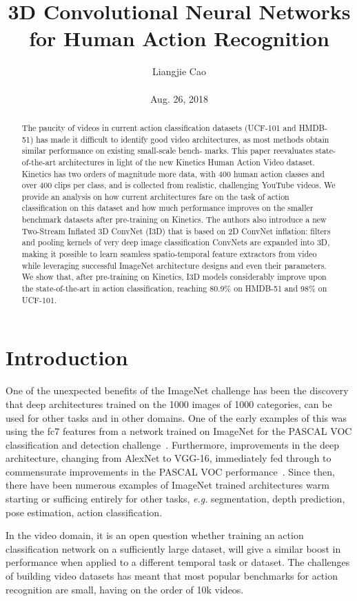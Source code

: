 \documentclass[10pt,twocolumn,letterpaper]{article}
\begin{document}
\title{\textbf{3D Convolutional Neural Networks for Human Action Recognition}}
\author{Liangjie Cao\\\\ Aug. 26, 2018}
\maketitle
\begin{abstract}
The paucity of videos in current action classification datasets (UCF-101 and HMDB-51) has made it difficult to identify good video architectures, as most methods obtain similar performance on existing small-scale bench-
marks. This paper reevaluates state-of-the-art architectures in light of the new Kinetics Human Action Video dataset. Kinetics has two orders of magnitude more data, with 400 human action classes and over 400 clips per
class, and is collected from realistic, challenging YouTube videos. We provide an analysis on how current architectures fare on the task of action classification on this dataset and how much performance improves on the smaller benchmark datasets after pre-training on Kinetics.
The authors also introduce a new Two-Stream Inflated 3D ConvNet (I3D) that is based on 2D ConvNet inflation: filters and pooling kernels of very deep image classification ConvNets are expanded into 3D, making it possible
to learn seamless spatio-temporal feature extractors from video while leveraging successful ImageNet architecture designs and even their parameters. We show that, after pre-training on Kinetics, I3D models considerably improve upon the state-of-the-art in action classification, reaching 80.9\% on HMDB-51 and 98\% on UCF-101.
\end{abstract}
\section{Introduction}
One of the unexpected benefits of the ImageNet challenge has been the discovery that deep architectures trained on the 1000 images of 1000 categories, can be used for other tasks and in other domains. One of the early examples of this was using the fc7 features from a network trained on
ImageNet for the PASCAL VOC classification and detection challenge~\cite{name1}. Furthermore, improvements in the deep architecture, changing from AlexNet to VGG-16, immediately fed through to commensurate improvements in the PASCAL VOC performance~\cite{name4}. Since then, there have been numerous examples of ImageNet trained architectures warm starting or sufficing entirely for other tasks, \emph{e.g.} segmentation, depth prediction, pose estimation, action classification.
\par In the video domain, it is an open question whether training an action classification network on a sufficiently large dataset, will give a similar boost in performance when applied to a different temporal task or dataset. The challenges of building video datasets has meant that most popular benchmarks for action recognition are small, having on
the order of 10k videos.
\end{document}
